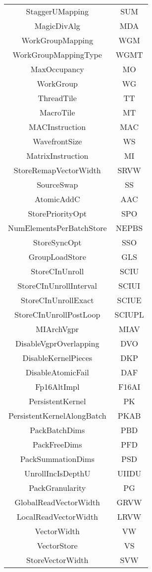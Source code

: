 \documentclass[]{article}
\begin{document}
\begin{center}
\begin{small}
\begin{longtable}{ |c|c| }
 StaggerUMapping & SUM \\
 MagicDivAlg & MDA \\
 WorkGroupMapping & WGM \\
 WorkGroupMappingType & WGMT \\
 MaxOccupancy & MO \\
 WorkGroup & WG \\
 ThreadTile & TT \\
 MacroTile & MT \\
 MACInstruction & MAC \\
 WavefrontSize & WS \\
 MatrixInstruction & MI \\
 StoreRemapVectorWidth & SRVW \\
 SourceSwap & SS \\
 AtomicAddC & AAC \\
 StorePriorityOpt & SPO \\
 NumElementsPerBatchStore & NEPBS \\
 StoreSyncOpt & SSO \\
 GroupLoadStore & GLS \\
 StoreCInUnroll & SCIU \\
 StoreCInUnrollInterval & SCIUI \\
 StoreCInUnrollExact & SCIUE \\
 StoreCInUnrollPostLoop & SCIUPL \\
 MIArchVgpr & MIAV \\
 DisableVgprOverlapping & DVO \\
 DisableKernelPieces & DKP \\
 DisableAtomicFail & DAF \\
 Fp16AltImpl & F16AI \\
 PersistentKernel & PK \\
 PersistentKernelAlongBatch & PKAB \\
 PackBatchDims & PBD \\
 PackFreeDims & PFD \\
 PackSummationDims & PSD \\
 UnrollIncIsDepthU & UIIDU \\
 PackGranularity & PG \\
 GlobalReadVectorWidth & GRVW \\
 LocalReadVectorWidth & LRVW \\
 VectorWidth & VW \\
 VectorStore & VS \\
 StoreVectorWidth & SVW \\

\end{longtable}
\end{small}
\end{center}
\end{document}
